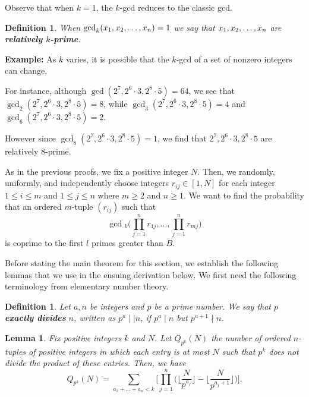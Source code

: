 \documentclass[12pt]{amsart}
\newtheorem{lemma}[theorem]{Lemma}
\newtheorem{definition}[theorem]{Definition}
\theoremstyle{definition}
\begin{document}
\noindent Observe that when $k=1$, the $k$-gcd reduces to the classic gcd.

\begin{definition} When $\gcd_k(x_1,x_2,\mathellipsis,x_n)=1$ we say that  $x_1,x_2,\mathellipsis,x_n$ are \textbf{relatively $k$-prime}.
\end{definition}

\noindent \textbf{Example:}
As $k$ varies, it is possible that the $k$-gcd of a set of nonzero integers can change. 

\noindent For instance, although $\gcd(2^7, 2^6 \cdot 3, 2^8 \cdot 5) = 64$, we see that $\gcd_2(2^7, 2^6 \cdot 3, 2^8 \cdot 5)=8$, while $\gcd_3(2^7, 2^6 \cdot 3, 2^8 \cdot 5)=4$ and $\gcd_6(2^7, 2^6 \cdot 3, 2^8 \cdot 5) = 2$. 

\noindent However since $\gcd_8(2^7, 2^6 \cdot 3, 2^8 \cdot 5) = 1$, we find that $2^7, 2^6 \cdot 3, 2^8 \cdot 5$ are relatively $8$-prime.

As in the previous proofs, we fix a positive integer $N$. Then, we randomly, uniformly, and independently choose integers $r_{ij} \in [1, N]$ for each integer $1 \leq i \leq m$ and $1 \leq j \leq n$ where $m \geq 2$ and $n \geq 1$. We want to find the probability that an ordered $m$-tuple $(r_{ij})$ such that 
$$\gcd{}_k\Big(\prod_{j=1}^nr_{1j}, ..., \prod_{j=1}^n r_{mj}\Big)$$
is coprime to the first $l$ primes greater than $B$. 

Before stating the main theorem for this section, we establish the following lemmas that we use in the ensuing derivation below. We first need the following terminology from elementary number theory.

\begin{definition}
	Let $a, n$ be integers and $p$ be a prime number. We say that $p$ \textbf{exactly divides} $n$, written as $p^a \mid \mid n$, if $p^a \mid n$ but $p^{a+1} \nmid n$. 
\end{definition}

\begin{lemma}
	Fix positive integers $k$ and $N$. Let $Q_{p^k}(N)$ the number of ordered $n$-tuples of positive integers in which each entry is at most $N$ such that $p^k$ does not divide the product of these entries. Then, we have
	$$Q_{p^k}(N) = \sum_{a_1+...+a_n < k} \Big[\prod_{j=1}^n \Big(\Big\lfloor \frac{N}{p^{a_j}}\Big\rfloor - \Big\lfloor \frac{N}{p^{a_j + 1}}\Big\rfloor\Big)\Big].$$
\end{lemma}
\end{document}
